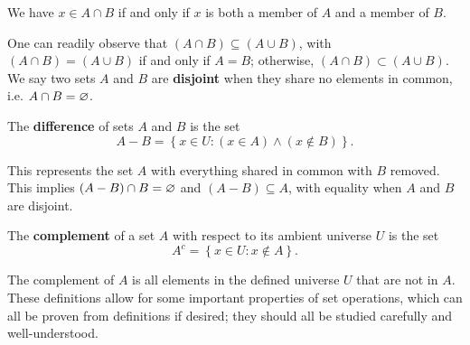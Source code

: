         We have $x \in A \cap B$ if and only if $x$ is both a member of $A$ and a member of $B$. 
        
        One can readily observe that $(A \cap B) \subseteq (A \cup B)$, with $(A\cap B) = (A \cup B)$ if and only if $A=B$; otherwise, $(A \cap B) \subset (A \cup B)$. We say two sets $A$ and $B$ are \textbf{disjoint} when they share no elements in common, i.e. $A \cap B = \varnothing$.

        \begin{definition}[Difference]\label{def:diff}
            The \textbf{difference} of sets $A$ and $B$ is the set $$A - B = \left\{x\in U: (x\in A) \land (x\not\in B)\right\}.$$
        \end{definition}

        \begin{marginfigure}
            
            \caption{The set $A - B$}
            \label{fig:difference}
        \end{marginfigure}

        This represents the set $A$ with everything shared in common with $B$ removed. This implies $(A - B) \cap B = \varnothing$ and $(A-B) \subseteq A$, with equality when $A$ and $B$ are disjoint.

        \begin{definition}[Complement]\label{def:comp}
            The \textbf{complement} of a set $A$ with respect to its ambient universe $U$ is the set $$A^c = \left\{x\in U: x\not\in A\right\}.$$
        \end{definition}

        \begin{marginfigure}
            
            \caption{The set $A^c$}
            \label{fig:complement}
        \end{marginfigure}

        The complement of $A$ is all elements in the defined universe $U$ that are not in $A$. These definitions allow for some important properties of set operations, which can all be proven from definitions if desired; they should all be studied carefully and well-understood.

